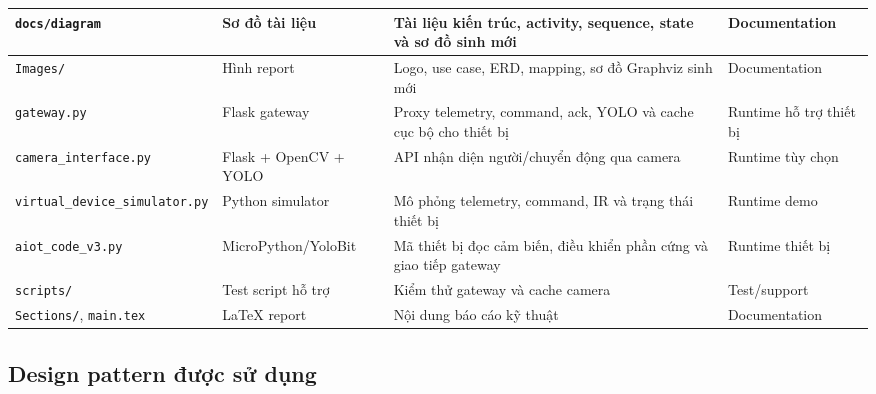 {\begin{longtable}{|p{}|p{}|p{}|p{}|}
\hline
\texttt{docs/diagram} & Sơ đồ tài liệu & Tài liệu kiến trúc, activity, sequence, state và sơ đồ sinh mới & Documentation \\
\hline
\texttt{Images/} & Hình report & Logo, use case, ERD, mapping, sơ đồ Graphviz sinh mới & Documentation \\
\hline
\texttt{gateway.py} & Flask gateway & Proxy telemetry, command, ack, YOLO và cache cục bộ cho thiết bị & Runtime hỗ trợ thiết bị \\
\hline
\texttt{camera\_interface.py} & Flask + OpenCV + YOLO & API nhận diện người/chuyển động qua camera & Runtime tùy chọn \\
\hline
\texttt{virtual\_device}\newline\texttt{\_simulator.py} & Python simulator & Mô phỏng telemetry, command, IR và trạng thái thiết bị & Runtime demo \\
\hline
\texttt{aiot\_code\_v3.py} & MicroPython/YoloBit & Mã thiết bị đọc cảm biến, điều khiển phần cứng và giao tiếp gateway & Runtime thiết bị \\
\hline
\texttt{scripts/} & Test script hỗ trợ & Kiểm thử gateway và cache camera & Test/support \\
\hline
\texttt{Sections/}, \texttt{main.tex} & LaTeX report & Nội dung báo cáo kỹ thuật & Documentation \\
\hline
\end{longtable}
}

\subsection{Design pattern được sử dụng}

